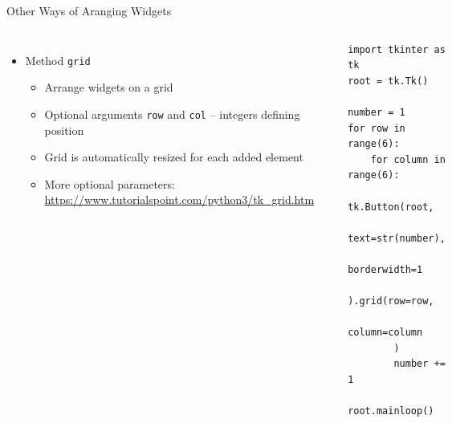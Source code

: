 
\begin{frame}[fragile]{Other Ways of Aranging Widgets}
%
\begin{columns}[T]
\begin{itemize}
\item Method \texttt{grid}
	\begin{itemize}
	\item Arrange widgets on a grid
	\item Optional arguments \texttt{row} and \texttt{col} -- integers defining position
	\item Grid is automatically resized for each added element
	\item More optional parameters: {\scriptsize \url{https://www.tutorialspoint.com/python3/tk_grid.htm}}
	\end{itemize}
\end{itemize}
\begin{center}
\includegraphics[width=.35\linewidth]{./gfx/12-tk-grid}
\end{center}
%
\begin{codebox}
\begin{verbatim}
import tkinter as tk
root = tk.Tk()

number = 1
for row in range(6):
    for column in range(6):
        tk.Button(root,
                  text=str(number),
                  borderwidth=1
        ).grid(row=row,
               column=column
        )
        number += 1

root.mainloop()
\end{verbatim}
\end{codebox}
\end{columns}
%
\end{frame}


